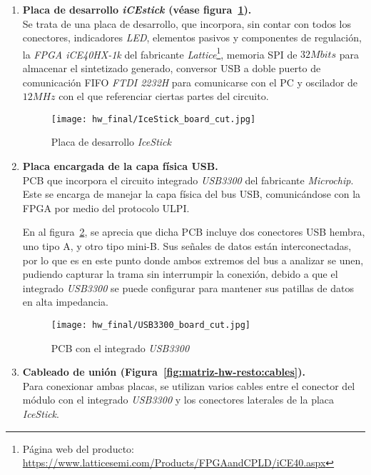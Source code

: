 \begin{enumerate}
    \item \textbf{Placa de desarrollo \emph{iCEstick \cite{icestickmanual}} (véase figura~\ref{fig:IceStick_board}).} \\
    Se trata de una placa de desarrollo, que incorpora, sin contar con todos los conectores, indicadores \emph{LED}, elementos pasivos y componentes de regulación, la \emph{FPGA iCE40HX-1k\cite{lattice:ice40}} del fabricante \emph{Lattice}\footnote{Página web del producto: \url{https://www.latticesemi.com/Products/FPGAandCPLD/iCE40.aspx}}, memoria SPI de $32Mbits$ para almacenar el sintetizado generado, conversor USB a doble puerto de comunicación FIFO \emph{FTDI 2232H\cite{FTDI:FT2232HL}} para comunicarse con el PC y oscilador de $12MHz$ con el que referenciar ciertas partes del circuito.
    
    \begin{figure}[htbp]
        \centering
        \texttt{[image: hw\_final/IceStick\_board\_cut.jpg]}
        \caption{Placa de desarrollo \emph{IceStick}}
        \label{fig:IceStick_board}
    \end{figure}

    \item \textbf{Placa encargada de la capa física USB.} \\
    PCB que incorpora el circuito integrado \emph{USB3300\cite{icestickmanual}} del fabricante \emph{Microchip}. Este se encarga de manejar la capa física del bus USB, comunicándose con la FPGA por medio del protocolo ULPI\cite{ulpi-specs}.

    En al figura~\ref{fig:USB3300_board}, se aprecia que dicha PCB incluye dos conectores USB hembra, uno tipo A, y otro tipo mini-B. Sus señales de datos están interconectadas, por lo que es en este punto donde ambos extremos del bus a analizar se unen, pudiendo capturar la trama sin interrumpir la conexión, debido a que el integrado \emph{USB3300} se puede configurar para mantener sus patillas de datos en alta impedancia.

    \begin{figure}[htbp]
        \centering
        \texttt{[image: hw\_final/USB3300\_board\_cut.jpg]}
        \caption{PCB con el integrado \emph{USB3300}}
        \label{fig:USB3300_board}
    \end{figure}

    \item \textbf{Cableado de unión (Figura~\ref{fig:matriz-hw-resto:cables}).} \\
    Para conexionar ambas placas, se utilizan varios cables entre el conector del módulo con el integrado \emph{USB3300} y los conectores laterales de la placa \emph{IceStick}.


\end{enumerate}
